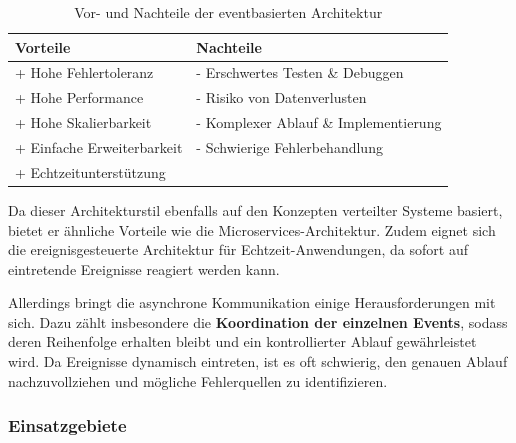         \begin{table}[H]
            \centering
            \begin{tabular}{|p{7.5cm}|p{7.5cm}|}
                \hline
                \cellcolor{green!40} \textbf{Vorteile} & \cellcolor{red!40} \textbf{Nachteile} \\ \hline
                 + Hohe Fehlertoleranz & - Erschwertes Testen \& Debuggen \\
                 + Hohe Performance & - Risiko von Datenverlusten \\ 
                 + Hohe Skalierbarkeit & - Komplexer Ablauf \& Implementierung \\
                 + Einfache Erweiterbarkeit & - Schwierige Fehlerbehandlung \\
                 + Echtzeitunterstützung & ~ \\
                \hline
            \end{tabular}
            \caption{Vor- und Nachteile der eventbasierten Architektur}
            \label{tab:event-driven-architecture-pros-and-cons}
        \end{table}

        Da dieser Architekturstil ebenfalls auf den Konzepten verteilter Systeme basiert, bietet er ähnliche Vorteile wie die Microservices-Architektur. Zudem eignet sich die ereignisgesteuerte Architektur für Echtzeit-Anwendungen, da sofort auf eintretende Ereignisse reagiert werden kann.
        
        Allerdings bringt die asynchrone Kommunikation einige Herausforderungen mit sich. Dazu zählt insbesondere die \textbf{Koordination der einzelnen Events}, sodass deren Reihenfolge erhalten bleibt und ein kontrollierter Ablauf gewährleistet wird. Da Ereignisse dynamisch eintreten, ist es oft schwierig, den genauen Ablauf nachzuvollziehen und mögliche Fehlerquellen zu identifizieren. \\
        \cite[S. 183, S. 205, S. 211-213]{EA:Book02}
    
    
        \subsubsection{Einsatzgebiete}

